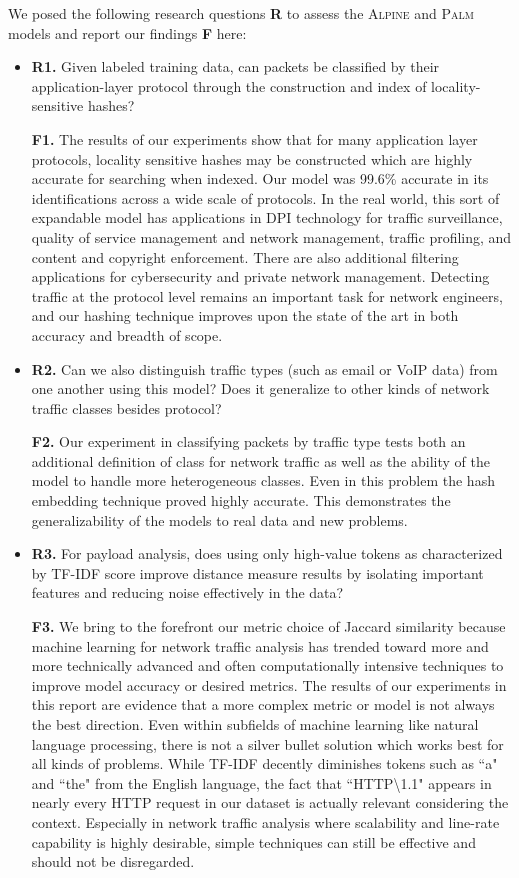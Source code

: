 We posed the following research questions \textbf{R} to assess the \textsc{Alpine} and \textsc{Palm} models and report our findings \textbf{F} here:

\begin{itemize}
\item\textbf{R1.} Given labeled training data, can packets be classified by their application-layer protocol through the construction and index of locality-sensitive hashes?

\textbf{F1.} The results of our experiments show that for many application layer protocols, locality sensitive hashes may be constructed which are highly accurate for searching when indexed. Our model was 99.6\% accurate in its identifications across a wide scale of protocols. In the real world, this sort of expandable model has applications in DPI technology for traffic surveillance, quality of service management and network management, traffic profiling, and content and copyright enforcement. There are also additional filtering applications for cybersecurity and private network management. Detecting traffic at the protocol level remains an important task for network engineers, and our hashing technique improves upon the state of the art in both accuracy and breadth of scope.

\item\textbf{R2.} Can we also distinguish traffic types (such as email or VoIP data) from one another using this model? Does it generalize to other kinds of network traffic classes besides protocol?

\textbf{F2.} Our experiment in classifying packets by traffic type tests both an additional definition of class for network traffic as well as the ability of the model to handle more heterogeneous classes. Even in this problem the hash embedding technique proved highly accurate. This demonstrates the generalizability of the models to real data and new problems.

\item\textbf{R3.} For payload analysis, does using only high-value tokens as characterized by TF-IDF score improve distance measure results by isolating important features and reducing noise effectively in the data?

\textbf{F3.} We bring to the forefront our metric choice of Jaccard similarity because machine learning for network traffic analysis has trended toward more and more technically advanced and often computationally intensive techniques to improve model accuracy or desired metrics. The results of our experiments in this report are evidence that a more complex metric or model is not always the best direction. Even within subfields of machine learning like natural language processing, there is not a silver bullet solution which works best for all kinds of problems. While TF-IDF decently diminishes tokens such as ``a" and ``the" from the English language, the fact that ``HTTP\textbackslash1.1" appears in nearly every HTTP request in our dataset is actually relevant considering the context. Especially in network traffic analysis where scalability and line-rate capability is highly desirable, simple techniques can still be effective and should not be disregarded.


\end{itemize}
